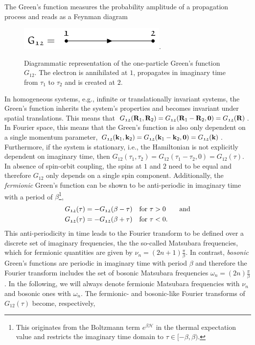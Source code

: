 \documentclass[../../main.tex]{subfiles}
\begin{document}
The Green's function measures the probability amplitude of a propagation process and reads as a Feynman diagram
\begin{figure}[ht!]
	\centering
	\includegraphics[scale=1.2]{Graphics/Diagrams/one_p_green/one_p_green}.
	\caption{Diagrammatic representation of the one-particle Green's function $G_{\mathfrak{12}}$. The electron is annihilated at $\mathfrak{1}$, propagates in imaginary time from $\tau_1$ to $\tau_2$ and is created at $\mathfrak{2}$.}
	\label{fig:one_p_green}
\end{figure}

In homogeneous systems, e.g., infinite or translationally invariant systems, the Green's function inherits the system's properties and becomes invariant under spatial translations. This means that $G_{\mathfrak{12}}(\textbf{R}_1, \textbf{R}_2)=G_{\mathfrak{12}}(\textbf{R}_1-\textbf{R}_2,\textbf{0})=G_{\mathfrak{12}}(\textbf{R})$. In Fourier space, this means that the Green's function is also only dependent on a single momentum parameter, $G_{\mathfrak{12}}(\textbf{k}_1, \textbf{k}_2)=G_{\mathfrak{12}}(\textbf{k}_1-\textbf{k}_2,\textbf{0})=G_{\mathfrak{12}}(\textbf{k})$. Furthermore, if the system is stationary, i.e., the Hamiltonian is not explicitly dependent on imaginary time, then $G_{\mathfrak{12}}(\tau_1, \tau_2)=G_{\mathfrak{12}}(\tau_1-\tau_2,0)=G_{\mathfrak{12}}(\tau)$. In absence of spin-orbit coupling, the spins at $\mathfrak{1}$ and $\mathfrak{2}$ need to be equal and therefore $G_{\mathfrak{12}}$ only depends on a single spin component. Additionally, the \textit{fermionic} Green's function can be shown to be anti-periodic in imaginary time with a period of $\beta$\footnote{This originates from the Boltzmann term $e^{\beta\hat{\mathcal{H}}}$ in the thermal expectation value and restricts the imaginary time domain to $\tau\in[-\beta,\beta)$.},
\begin{subequations}
\begin{align}
	G_{\mathfrak{12}}(\tau)&=-G_{\mathfrak{12}}(\beta-\tau)\quad\text{for } \tau>0 \qquad\text{and}\\
	G_{\mathfrak{12}}(\tau)&=-G_{\mathfrak{12}}(\beta+\tau)\quad\text{for } \tau<0.
\end{align}
\end{subequations}
This anti-periodicity in time leads to the Fourier transform to be defined over a discrete set of imaginary frequencies, the the so-called Matsubara frequencies, which for fermionic quantities are given by $\nu_n=(2n+1)\frac\pi\beta$. In contrast, \textit{bosonic} Green's functions are periodic in imaginary time with period $\beta$ and therefore the Fourier transform includes the set of bosonic Matsubara frequencies $\omega_n=(2n)\frac\pi\beta$. In the following, we will always denote fermionic Matsubara frequencies with $\nu_n$ and bosonic ones with $\omega_n$. The fermionic- and bosonic-like Fourier transforms of $G_{\mathfrak{12}}(\tau)$ become, respectively,
\end{document}
